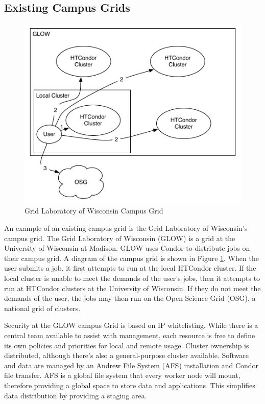 
\subsection{Existing Campus Grids}



\begin{figure}[h!t]
	\centering
	\includegraphics[scale=0.6]{images/GLOW-Campus}
	\caption{Grid Laboratory of Wisconsin Campus Grid}
	\label{fig:GLOWCampus}
\end{figure}

An example of an existing campus grid is the Grid Laboratory of Wisconsin's campus grid.  The Grid Laboratory of Wisconsin (GLOW) \cite{gridworkshopweb, glowwebsite} is a grid at the University of Wisconsin at Madison.  GLOW uses Condor to distribute 
jobs on their campus grid.  A diagram of the campus grid is shown in Figure \ref{fig:GLOWCampus}.  When the user submits a job, it first attempts to run at the local HTCondor cluster.  If the local cluster is unable to meet the demands of the user's jobs, then it attempts to run at HTCondor clusters at the University of Wisconsin.  If they do not meet the demands of the user, the jobs may then run on the Open Science Grid (OSG), a national grid of clusters.

Security at the GLOW campus Grid is based on IP whitelisting.  While there is a central 
team available to assist with management, each resource is free to define its own policies and priorities for local 
and remote usage.  Cluster ownership is distributed, although there's also a general-purpose cluster available.  
Software and data are managed by an Andrew File System (AFS) \cite{morris1986andrew} installation and Condor file transfer.  AFS is a global file system
that every worker node will mount, therefore providing a global space to store data and applications.  This simplifies data distribution
by providing a staging area.


